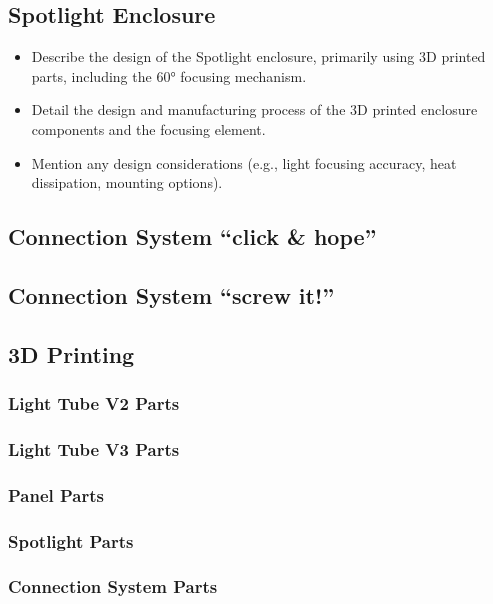 \subsection{Spotlight Enclosure}
\label{subsec:spotlight_enclosure}
\begin{itemize}
	\item Describe the design of the Spotlight enclosure, primarily using 3D printed parts, including the 60° focusing mechanism.
	\item Detail the design and manufacturing process of the 3D printed enclosure components and the focusing element.
	\item Mention any design considerations (e.g., light focusing accuracy, heat dissipation, mounting options).
\end{itemize}

\subsection{Connection System \enquote{click \& hope}}

\subsection{Connection System \enquote{screw it!}}

\subsection{3D Printing}

\subsubsection{Light Tube V2 Parts}

\subsubsection{Light Tube V3 Parts}

\subsubsection{Panel Parts}

\subsubsection{Spotlight Parts}

\subsubsection{Connection System Parts}